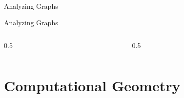 \documentclass{beamer}
\begin{document}
\begin{frame}{Analyzing Graphs}
    \begin{center}
        
    \end{center}
\end{frame}

\begin{frame}{Analyzing Graphs}
    \begin{columns}
        \begin{column}{0.5\pagewidth}
            \begin{figure}[t]
                \centering
                
            \end{figure}
        \end{column}
        \begin{column}{0.5\pagewidth}
            \begin{figure}[t]
                \centering
                
            \end{figure}
        \end{column}
    \end{columns}
\end{frame}


\section{Computational Geometry}
\end{document}
